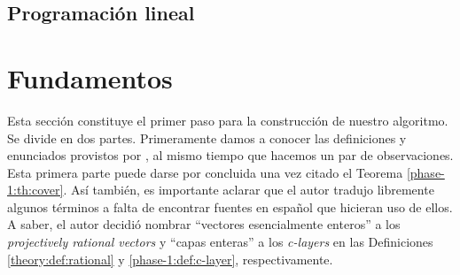 
\subsection{Programación lineal}


\section{Fundamentos}
\noindent
Esta sección constituye el primer paso para la construcción de nuestro algoritmo. Se divide en dos
partes. Primeramente damos a conocer las definiciones y enunciados provistos por \cite{herr}, al
mismo tiempo que hacemos un par de observaciones. Esta primera parte puede darse por concluida una
vez citado el Teorema \ref{phase-1:th:cover}. Así también, es importante aclarar que el autor
tradujo libremente algunos términos a falta de encontrar fuentes en español que hicieran uso de
ellos. A saber, el autor decidió nombrar ``vectores esencialmente enteros'' a los
\textit{projectively rational vectors} y ``capas enteras'' a los \textit{c-layers} en las
Definiciones \ref{theory:def:rational} y \ref{phase-1:def:c-layer}, respectivamente.

